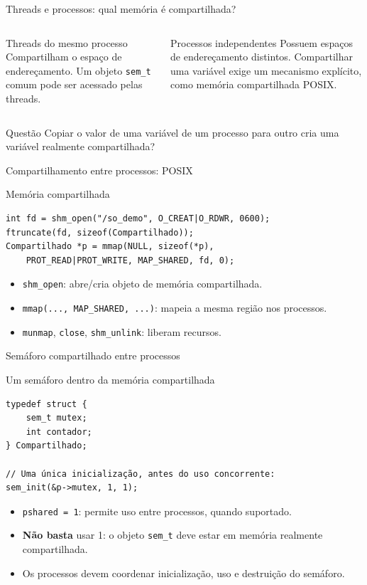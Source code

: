 \documentclass[aspectratio=169,11pt]{beamer}
\begin{document}
\begin{frame}{Threads e processos: qual memória é compartilhada?}
\small
\begin{columns}[T]
\begin{block}{Threads do mesmo processo}
Compartilham o espaço de endereçamento. Um objeto \texttt{sem\_t} comum pode ser acessado pelas threads.
\end{block}
\begin{block}{Processos independentes}
Possuem espaços de endereçamento distintos. Compartilhar uma variável exige um mecanismo explícito, como memória compartilhada POSIX.
\end{block}
\end{columns}
\vspace{.3cm}
\begin{alertblock}{Questão}
Copiar o valor de uma variável de um processo para outro cria uma variável realmente compartilhada?
\end{alertblock}
\end{frame}

\begin{frame}[fragile]{Compartilhamento entre processos: POSIX}
\small
\begin{block}{Memória compartilhada}
\begin{verbatim}
int fd = shm_open("/so_demo", O_CREAT|O_RDWR, 0600);
ftruncate(fd, sizeof(Compartilhado));
Compartilhado *p = mmap(NULL, sizeof(*p),
    PROT_READ|PROT_WRITE, MAP_SHARED, fd, 0);
\end{verbatim}
\end{block}
\begin{itemize}
\item \texttt{shm\_open}: abre/cria objeto de memória compartilhada.
\item \texttt{mmap(..., MAP\_SHARED, ...)}: mapeia a mesma região nos processos.
\item \texttt{munmap}, \texttt{close}, \texttt{shm\_unlink}: liberam recursos.
\end{itemize}
\end{frame}

\begin{frame}[fragile]{Semáforo compartilhado entre processos}
\small
\begin{block}{Um semáforo dentro da memória compartilhada}
\begin{verbatim}
typedef struct {
    sem_t mutex;
    int contador;
} Compartilhado;

// Uma única inicialização, antes do uso concorrente:
sem_init(&p->mutex, 1, 1);
\end{verbatim}
\end{block}
\begin{itemize}
\item \texttt{pshared = 1}: permite uso entre processos, quando suportado.
\item \textbf{Não basta} usar 1: o objeto \texttt{sem\_t} deve estar em memória realmente compartilhada.
\item Os processos devem coordenar inicialização, uso e destruição do semáforo.
\end{itemize}
\end{frame}
\end{document}
